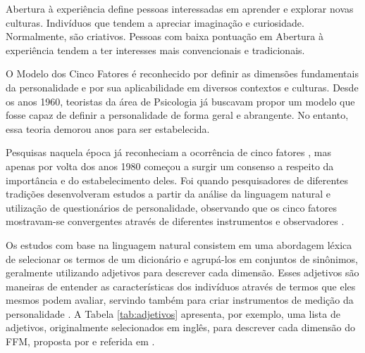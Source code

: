 Abertura à experiência define pessoas interessadas em aprender e explorar novas culturas. Indivíduos que tendem a apreciar imaginação e curiosidade. Normalmente, são criativos. Pessoas com baixa pontuação em Abertura à experiência tendem a ter interesses mais convencionais e tradicionais.

O Modelo dos Cinco Fatores é reconhecido por definir as dimensões fundamentais da personalidade e por sua aplicabilidade em diversos contextos e culturas. Desde os anos 1960, teoristas da área de Psicologia já buscavam propor um modelo que fosse capaz de definir a personalidade de forma geral e abrangente. No entanto, essa teoria demorou anos para ser estabelecida.

Pesquisas naquela época já reconheciam a ocorrência de cinco fatores \cite{tupes:61} \cite{norman:63}, mas apenas por volta dos anos 1980 começou a surgir um consenso a respeito da importância e do estabelecimento deles. Foi quando pesquisadores de diferentes tradições desenvolveram estudos a partir da análise da linguagem natural e utilização de questionários de personalidade, observando que os cinco fatores mostravam-se convergentes através de diferentes instrumentos e observadores \cite{mccrae:92}.

Os estudos com base na linguagem natural consistem em uma abordagem léxica de selecionar os termos de um dicionário %
e agrupá-los em conjuntos de sinônimos, geralmente utilizando adjetivos para descrever cada dimensão. Esses adjetivos são maneiras de entender as características dos indivíduos através de termos que eles mesmos podem avaliar, servindo também para criar instrumentos de medição da personalidade \cite{goldberg:83} \cite{mccrae:85}. A Tabela \ref{tab:adjetivos} apresenta, por exemplo, uma lista de adjetivos, originalmente selecionados em inglês, para descrever cada dimensão do FFM, proposta por \cite{john:89} e referida em \cite{mccrae:92}.

